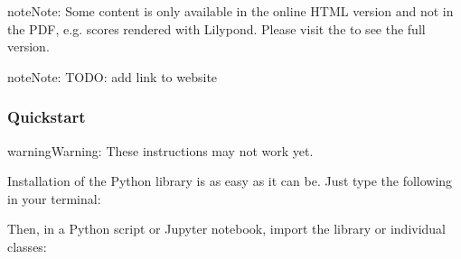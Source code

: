 \documentclass[letterpaper,10pt,english]{sphinxmanual}
\begin{document}
\begin{sphinxadmonition}{note}{Note:}
\sphinxAtStartPar
Some content is only available in the online HTML version and not in the PDF,
e.g. scores rendered with Lilypond. Please visit the  to see the full version.
\end{sphinxadmonition}

\begin{sphinxadmonition}{note}{Note:}
\sphinxAtStartPar
TODO: add link to website
\end{sphinxadmonition}
\subsubsection*{Quickstart}

\begin{sphinxadmonition}{warning}{Warning:}
\sphinxAtStartPar
These instructions may not work yet.
\end{sphinxadmonition}

\sphinxAtStartPar
Installation of the  Python library is as easy as it can be. Just
type the following in your terminal:

\begin{sphinxVerbatim}[commandchars=\\\{\}]
  
\end{sphinxVerbatim}

\sphinxAtStartPar
Then, in a Python script or Jupyter notebook,
import the library or individual classes:

\begin{sphinxVerbatim}[commandchars=\\\{\}]
    

     
     

   

  
\end{sphinxVerbatim}
\end{document}
